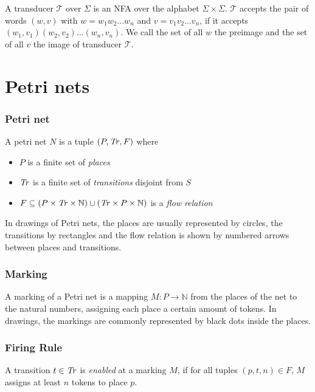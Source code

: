 A transducer $\mathcal{T}$ over $\Sigma$ is an NFA over the alphabet $\Sigma \times \Sigma$. $\mathcal{T}$ accepts the pair of words $(w,v)$ with $w = w_{1}w_{2}...w_{n}$ and $v=v_{1}v_{2}...v_{n}$, if it accepts $(w_{1},v_{1})(w_{2},v_{2})...(w_{n},v_{n})$.
We call the set of all $w$ the preimage and the set of all $v$ the image of transducer $\mathcal{T}$.


\section{Petri nets}

\subsubsection{Petri net}

A petri net $N$ is a tuple $(P,\mathit{Tr},F)$ where 
\begin{itemize}[-,noitemsep]
	\item $P$ is a finite set of \emph{places}
	\item $\mathit{Tr}$ is a finite set of \emph{transitions} disjoint from $S$
	\item $F \subseteq (P \times \mathit{Tr} \times \mathbb{N}) \cup (\mathit{Tr} \times P \times \mathbb{N})$ is a \emph{flow relation}
\end{itemize}

In drawings of Petri nets, the places are usually represented by circles, the transitions by rectangles and the flow relation is shown by numbered arrows between places and transitions.

\subsubsection{Marking}
A marking of a Petri net is a mapping $M : P \rightarrow \mathbb{N}$ from the places of the net to the natural numbers, assigning each place a certain amount of tokens. In drawings, the markings are commonly represented by black dots inside the places.


\subsubsection{Firing Rule}
A transition $t \in \mathit{Tr}$ is \emph{enabled} at a marking $M$, if for all tuples $(p,t,n) \in F$, $M$ assigns at least $n$ tokens to place $p$.

